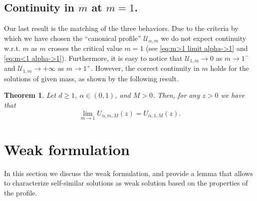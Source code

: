 \documentclass[a4paper]{article}
\newtheorem{theorem}{Theorem}[section]
\theoremstyle{definition}
\begin{document}
\subsection{Continuity in $m$ at $m=1$.}
Our last result is the matching of the three behaviors. Due to the criteria by which we have chosen the ``canonical profile'' $\mathcal U_{\alpha,m}$ we do not expect continuity w.r.t. $m$ as $m$ crosses the critical value $m = 1$ (see \eqref{eq:m>1 limit alpha->1} and \eqref{eq:m<1 alpha->1}). 
Furthermore, it is easy to notice that $\mathcal U_{1,m} \to 0$ as $m \to 1^-$ and $\mathcal U_{1,m} \to +\infty$ as $m \to 1^+$.
However, the correct continuity in $m$ holds for the solutions of given mass, as shown by the following result.
\begin{theorem}
  \label{thm:limit m->1}
  Let $d \ge 1$, $\alpha \in (0,1)$, and $M > 0$. Then, for any $z > 0$ we have that
  \begin{equation*}
    \lim_{m \to 1} U_{\alpha,m,M}(z) = U_{\alpha,1,M}(z).
  \end{equation*}
\end{theorem}

%
\section{Weak formulation}

In this section we discuss the weak formulation, and provide a lemma that allows to characterize self-similar solutions as weak solution based on the properties of the profile.
\end{document}
